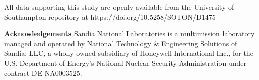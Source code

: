 \documentclass[runningheads,a4paper]{llncs}
\begin{document}
\vspace{6 pt}
\begin{scriptsize}
	
	\par
	\noindent
	All data supporting this study are openly available from the University of Southampton repository at
	https://doi.org/10.5258/SOTON/D1475\\

	\par
	\noindent
	\textbf{Acknowledgements} Sandia National Laboratories is a multimission laboratory managed and operated by National Technology \& Engineering Solutions of Sandia, LLC, a wholly owned subsidiary of Honeywell International Inc., for the U.S. Department of Energy’s National Nuclear Security Administration under contract DE-NA0003525.
	
\end{scriptsize}




\end{document}
